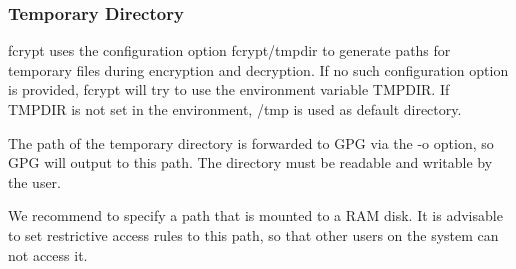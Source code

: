 \subsubsection*{Temporary Directory}

{\ttfamily fcrypt} uses the configuration option {\ttfamily fcrypt/tmpdir} to generate paths for temporary files during encryption and decryption. If no such configuration option is provided, {\ttfamily fcrypt} will try to use the environment variable {\ttfamily T\+M\+P\+D\+IR}. If {\ttfamily T\+M\+P\+D\+IR} is not set in the environment, {\ttfamily /tmp} is used as default directory.

The path of the temporary directory is forwarded to G\+PG via the {\ttfamily -\/o} option, so G\+PG will output to this path. The directory must be readable and writable by the user.

We recommend to specify a path that is mounted to a R\+AM disk. It is advisable to set restrictive access rules to this path, so that other users on the system can not access it. 